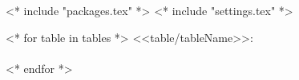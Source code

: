 <* include "packages.tex" *>
<* include "settings.tex" *>

	\begin{center}
<* for table in tables *>
		<<table/tableName>>:\\
		
		\hfill\\
<* endfor *>
	\end{center}

